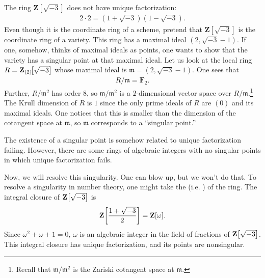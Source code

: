 \documentclass [11 pt, oneside] {article}
\begin{document}
\begin{example}[ ]\label{}\text{}
The ring $\mathbf{Z}\!\left[\sqrt{-3}\right]$ does not have unique factorization:
\begin{align*}
	2\cdot 2 = (1+\sqrt{-3} ) (1-\sqrt{-3} ).
\end{align*}
Even though it is the coordinate ring of a scheme, pretend that $\mathbf{Z}\!\left[\sqrt{-3}\right]$ is the coordinate ring of a variety. This ring has a maximal ideal $(2,\sqrt{-3}-1 )$. If one, somehow, thinks of maximal ideals as points, one wants to show that the variety has a singular point at that maximal ideal. Let us look at the local ring $R=\mathbf Z_{(2)} \!\!\left[ \sqrt{-3}  \right] $ whose maximal ideal is $\mathfrak{m}=(2,\sqrt{-3}-1 )$. One sees that \begin{align*}
	R/\mathfrak{m} = \mathbf{F}_{2}.
\end{align*}
Further, $R/\mathfrak{m}^2$ has order $8$, so $\mathfrak{m}/\mathfrak{m}^2$ is a $2$-dimensional vector space over $R/\mathfrak{m}$.\footnote{Recall that $\mathfrak{m}/\mathfrak{m}^2$ is the Zariski cotangent space at $\mathfrak{m}$.} The Krull dimension of $R$ is $1$ since the only prime ideals of $R$ are $(0)$ and its maximal ideals. One notices that this is smaller than the dimension of the cotangent space at $\mathfrak{m}$, so $\mathfrak{m}$ corresponds to a ``singular point.''

\begin{remark}
	The existence of a singular point is somehow related to unique factorization failing. However, there are some rings of algebraic integers with no singular points in which unique factorization fails. 
\end{remark}

Now, we will resolve this singularity. One can blow up, but we won't do that. To resolve a singularity in number theory, one might take the  (i.e. ) of the ring. The integral closure of $\mathbf Z\!\left[ \sqrt{-3}  \right] $ is
\begin{align*}
	\mathbf Z \!\left[ \frac{1+\sqrt{-3} }{2} \right] = \mathbf Z[\omega] .
\end{align*}
Since $\omega^2+\omega+1=0$, $\omega$ is an algebraic integer in the field of fractions of $\mathbf Z\!\left[ \sqrt{-3}  \right] $. This integral closure has unique factorization, and its points are nonsingular.
\end{example}
\end{document}
